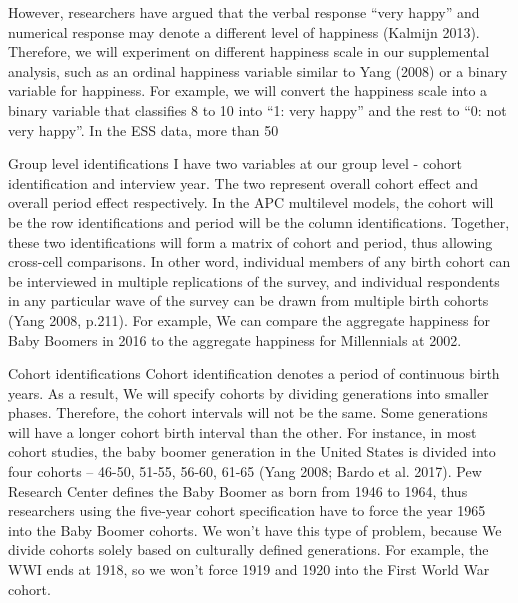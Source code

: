 However, researchers have argued that the verbal response “very happy” and numerical response may denote a different level of happiness (Kalmijn 2013). Therefore, we will experiment on different happiness scale in our supplemental analysis, such as an ordinal happiness variable similar to Yang (2008) or a binary variable for happiness. For example, we will convert the happiness scale into a binary variable that classifies 8 to 10 into “1: very happy” and the rest to “0: not very happy”. In the ESS data, more than 50%

Group level identifications
I have two variables at our group level - cohort identification and interview year. The two represent overall cohort effect and overall period effect respectively. In the APC multilevel models, the cohort will be the row identifications and period will be the column identifications. Together, these two identifications will form a matrix of cohort and period, thus allowing cross-cell comparisons. In other word, individual members of any birth cohort can be interviewed in multiple replications of the survey, and individual respondents in any particular wave of the survey can be drawn from multiple birth cohorts (Yang 2008, p.211). For example, We can compare the aggregate happiness for Baby Boomers in 2016 to the aggregate happiness for Millennials at 2002.

Cohort identifications 
Cohort identification denotes a period of continuous birth years. As a result, We will specify cohorts by dividing generations into smaller phases. Therefore, the cohort intervals will not be the same. Some generations will have a longer cohort birth interval than the other. For instance, in most cohort studies, the baby boomer generation in the United States is divided into four cohorts – 46-50, 51-55, 56-60, 61-65 (Yang 2008; Bardo et al. 2017). Pew Research Center defines the Baby Boomer as born from 1946 to 1964, thus researchers using the five-year cohort specification have to force the year 1965 into the Baby Boomer cohorts. We won’t have this type of problem, because We divide cohorts solely based on culturally defined generations. For example, the WWI ends at 1918, so we won’t force 1919 and 1920 into the First World War cohort.

